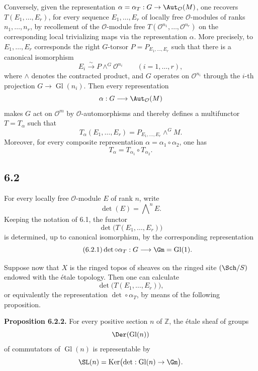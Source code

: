 \documentclass[11pt]{article}
\providecommand{\Gl}{\operatorname{Gl}}
\providecommand{\Ker}{\operatorname{Ker}}
\begin{document}
Conversely, given the representation \(\alpha=\alpha_T:G\to\Aut_{\mathcal O}(M)\), one recovers \(T(E_1,\ldots,E_r)\), for every sequence \(E_1,\ldots,E_r\) of locally free \(\mathcal O\)-modules of ranks \(n_1,\ldots,n_r\), by recollement of the \(\mathcal O\)-module free \(T(\mathcal O^{n_1},\ldots,\mathcal O^{n_r})\) on the corresponding local trivializing maps via the representation \(\alpha\). More precisely, to \(E_1,\ldots,E_r\) corresponds the right \(G\)-torsor \(P=P_{E_1,\ldots,E_r}\) such that there is a canonical isomorphism
\begin{equation}\tag{6.1.3}
 E_i\overset{\sim}{\longrightarrow} P\wedge^G\mathcal O^{n_i}\qquad (i=1,\ldots,r),
\end{equation}
where \(\wedge\) denotes the contracted product, and \(G\) operates on \(\mathcal O^{n_i}\) through the \(i\)-th projection \(G\to\Gl(n_i)\). Then every representation
\[
 \alpha:G\longrightarrow\Aut_{\mathcal O}(M)
\]
makes \(G\) act on \(\mathcal O^m\) by \(\mathcal O\)-automorphisms and thereby defines a multifunctor \(T=T_\alpha\) such that
\begin{equation}\tag{6.1.4}
 T_\alpha(E_1,\ldots,E_r)=P_{E_1,\ldots,E_r}\wedge^G M.
\end{equation}
Moreover, for every composite representation \(\alpha=\alpha_1\circ\alpha_2\), one has
\begin{equation}\tag{6.1.5}
 T_\alpha=T_{\alpha_1}\circ T_{\alpha_2}.
\end{equation}

\subsection*{6.2}
For every locally free \(\mathcal O\)-module \(E\) of rank \(n\), write
\[
 \det(E)=\bigwedge\nolimits^n E.
\]
Keeping the notation of 6.1, the functor
\[
 \det\bigl(T(E_1,\ldots,E_r)\bigr)
\]
is determined, up to canonical isomorphism, by the corresponding representation
\begin{equation}\tag{6.2.1}
 \det\circ\alpha_T:G\longrightarrow\Gm=\Gl(1).
\end{equation}

Suppose now that \(X\) is the ringed topos of sheaves on the ringed site \((\Sch/S)\) endowed with the étale topology. Then one can calculate
\[
 \det\bigl(T(E_1,\ldots,E_r)\bigr),
\]
or equivalently the representation \(\det\circ\alpha_T\), by means of the following proposition.

\textbf{Proposition 6.2.2.} For every positive section \(n\) of \(\mathbb Z\), the étale sheaf of groups
\[
 \Der(\Gl(n))
\]
of commutators of \(\Gl(n)\) is representable by
\[
 \SL(n)=\Ker\bigl(\det:\Gl(n)\to\Gm\bigr).
\]
\end{document}
